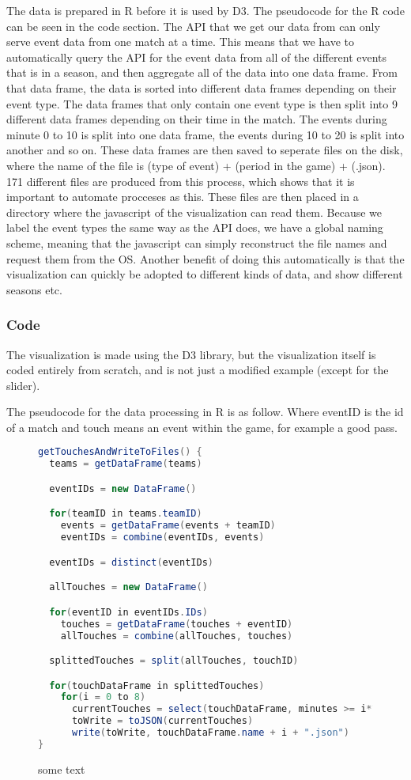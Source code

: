 \documentclass[Report.tex]{subfiles}
\begin{document}
The data is prepared in R before it is used by D3. The pseudocode for the R code can be seen in the code section. The API that we get our data from can only serve event data from one match at a time. This means that we have to automatically query the API for the event data from all of the different events that is in a season, and then aggregate all of the data into one data frame. From that data frame, the data is sorted into different data frames depending on their event type. The data frames that only contain one event type is then split into 9 different data frames depending on their time in the match. The events during minute 0 to 10 is split into one data frame, the events during 10 to 20 is split into another and so on. These data frames are then saved to seperate files on the disk, where the name of the file is (type of event) + (period in the game) + (.json). 171 different files are produced from this process, which shows that it is important to automate procceses as this. These files are then placed in a directory where the javascript of the visualization can read them. Because we label the event types the same way as the API does, we have a global naming scheme, meaning that the javascript can simply reconstruct the file names and request them from the OS. Another benefit of doing this automatically is that the visualization can quickly be adopted to different kinds of data, and show different seasons etc.

\subsubsection{Code}
The visualization is made using the D3 library, but the visualization itself is coded entirely from scratch, and is not just a modified example (except for the slider).

The pseudocode for the data processing in R is as follow.
Where eventID is the id of a match and touch means an event within the game, for example a good pass.
\begin{figure}
\begin{lstlisting}[language=java]
getTouchesAndWriteToFiles() {
  teams = getDataFrame(teams)

  eventIDs = new DataFrame()

  for(teamID in teams.teamID)
    events = getDataFrame(events + teamID)
    eventIDs = combine(eventIDs, events)

  eventIDs = distinct(eventIDs)

  allTouches = new DataFrame()

  for(eventID in eventIDs.IDs)
    touches = getDataFrame(touches + eventID)
    allTouches = combine(allTouches, touches)

  splittedTouches = split(allTouches, touchID)

  for(touchDataFrame in splittedTouches)
    for(i = 0 to 8)
      currentTouches = select(touchDataFrame, minutes >= i*10 AND minutes < (i + 1)*10)
      toWrite = toJSON(currentTouches)
      write(toWrite, touchDataFrame.name + i + ".json")
}
\end{lstlisting}
\caption{some text}
\end{figure}
\end{document}
